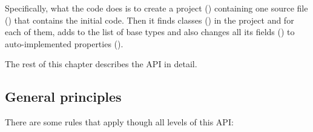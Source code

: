Specifically, what the code does is to create a project () containing one source file () that contains the initial code. Then it finds classes () in the project and for each of them, adds  to the list of base types and also changes all its fields () to auto-implemented properties ().

The rest of this chapter describes the \ac{API} in detail.

\subsection{General principles}

There are some rules that apply though all levels of this \ac{API}:

